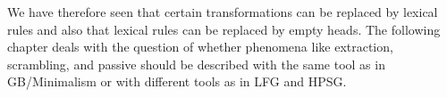 We have therefore seen that certain transformations can be replaced by lexical rules and also that
lexical rules can be replaced by empty heads. 
The following chapter
deals with the question of whether phenomena like extraction, scrambling, and passive should be
described with the same tool as in GB/Minimalism or with different tools as in LFG and HPSG.



